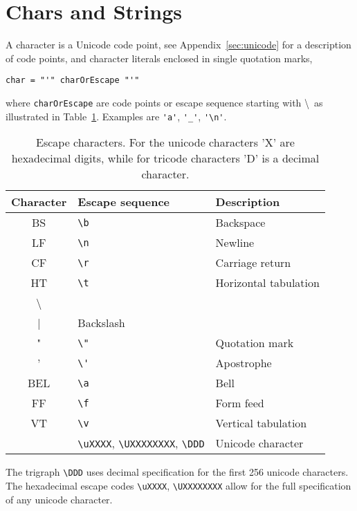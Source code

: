 
\section{Chars and Strings}
A character is a Unicode code point, see Appendix~\ref{sec:unicode} for a description of code points, and character literals enclosed in single quotation marks,
%
 \begin{lstlisting}[language=EBNF]
   char = "'" charOrEscape "'"
\end{lstlisting}
% 
where \lstinline[language=EBNF]{charOrEscape} are code points or escape sequence starting with \textbackslash\ as illustrated in Table~\ref{tab:escapeChar}. Examples are \lstinline{'a'}, \lstinline{'_'}, \lstinline{'\n'}.
\begin{table}
  \centering
  \begin{tabular}{|c|l|l|}
    \hline
    Character& Escape sequence & Description\\
    \hline
    BS &\lstinline|\b|& Backspace\\
    LF &\lstinline|\n|&Newline\\
    CF &\lstinline|\r|&Carriage return\\
    HT &\lstinline|\t|&Horizontal tabulation\\
    \textbackslash &\lstinline|\\|&Backslash\\
     " &\lstinline|\"|&Quotation mark\\
    ' &\lstinline|\'|&Apostrophe\\
    BEL&\lstinline|\a|& Bell\\
    FF&\lstinline|\f|&Form feed\\
    VT &\lstinline|\v|&Vertical tabulation\\
    &\lstinline|\uXXXX|, \lstinline|\UXXXXXXXX|, \lstinline|\DDD|&Unicode character\\
    \hline
  \end{tabular}
  \caption{Escape characters. For the unicode characters 'X' are hexadecimal digits, while for tricode characters 'D' is a decimal character.}
  \label{tab:escapeChar}
\end{table}
The trigraph \lstinline|\DDD| uses decimal specification for the first 256 unicode characters. The hexadecimal escape codes \lstinline|\uXXXX|, \lstinline|\UXXXXXXXX| allow for the full specification of any unicode character.

